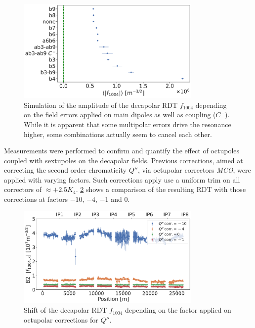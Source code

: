 \begin{figure}[!htb]
    \centering
    \includegraphics[width=0.8\textwidth]{./images/f1004/f1004_several_factors.pdf}
    \caption{Simulation of the amplitude of the decapolar RDT $f_{1004}$ depending on the field
             errors applied on main dipoles as well as coupling ($C^-$). While it is apparent that
             some multipolar errors drive the resonance higher, some combinations actually seem to
             cancel each other.}
    \label{fig:decapoles:rdts:contributions}
\end{figure}


Measurements were performed to confirm and quantify the effect of octupoles coupled with sextupoles
on the decapolar fields. Previous corrections, aimed at correcting the second order chromaticity
$Q''$, via octupolar correctors \textit{MCO}, were applied with varying factors. Such corrections
apply use a uniform trim on all correctors of $\approx +2.5K_4$.
\cref{decapoles:rdts:measured_f1004_mco} shows a comparison of the resulting RDT with those
corrections at factors $-10$, $-4$, $-1$ and $0$.

\begin{figure}[!htb]
    \centering
    \includegraphics[width=0.8\textwidth]{./images/f1004/f1004x_mco_corr.pdf}
    \caption{Shift of the decapolar RDT $f_{1004}$ depending on the factor applied on octupolar
    corrections for $Q''$.}
    \label{decapoles:rdts:measured_f1004_mco}
\end{figure}

